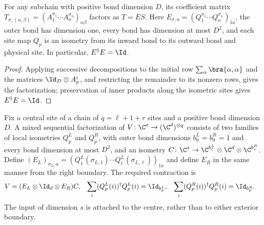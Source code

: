 \begin{lemma}
    \label{thm:ldp_pair_coefficient_factorization}
    \leanok
    For any subchain with positive bond dimension $D$, its coefficient
    matrix $T_{\sigma,(\alpha,\beta)}=(A_1^{\sigma_1}\cdots
        A_n^{\sigma_n})_{\alpha\beta}$ factors as $T=ES$.
    Here $E_{\sigma,a}=(Q_1^{\sigma_1}\cdots Q_n^{\sigma_n})_{1a}$,
    the outer bond has dimension one, every bond has dimension at most
    $D^2$, and each site map $Q_p$ is an isometry from its inward bond
    to its outward bond and physical site. In particular, $E^\dagger E=\Id$.
\end{lemma}
\begin{proof}
    \leanok
    Applying successive decompositions to the initial row
    $\sum_\alpha\bra{\alpha,\alpha}$ and the matrices $\Id_D\otimes A_p^i$,
    and restricting the remainder to its nonzero rows, gives the factorization;
    preservation of inner products along the isometric sites gives
    $E^\dagger E=\Id$.
\end{proof}

\begin{definition}
    \label{def:ldp_mixed_sequential}
    \leanok
    Fix a central site of a chain of $q=\ell+1+r$ sites and a positive
    bond dimension $D$. A mixed sequential factorization of
    $V\colon\C^s\to(\C^d)^{\otimes q}$ consists of two families of local
    isometries $Q^L_p$ and $Q^R_p$, with outer bond dimensions
    $b^L_0=b^R_0=1$ and every bond dimension at most $D^2$, and an isometry
    $C\colon\C^s\to\C^{b^L_\ell}\otimes\C^d\otimes\C^{b^R_r}$.
    Define $(E_L)_{\sigma_L,a}=(Q^L_1(\sigma_{L,1})\cdots
        Q^L_\ell(\sigma_{L,\ell}))_{1a}$ and define $E_R$ in the same manner
    from the right boundary. The required contraction is
    \begin{align}
        V & =(E_L\otimes\Id_d\otimes E_R)C,
          & \sum_i(Q^L_p(i))^\dagger Q^L_p(i) & =\Id_{b^L_p},
          & \sum_i(Q^R_p(i))^\dagger Q^R_p(i) & =\Id_{b^R_p}.
        \label{eq:ldp_mixed_factorization}
    \end{align}
    The input of dimension $s$ is attached to the centre, rather than to
    either exterior boundary.
\end{definition}

